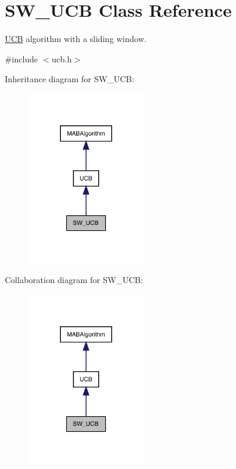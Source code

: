 \hypertarget{class_s_w___u_c_b}{}\section{S\+W\+\_\+\+U\+CB Class Reference}
\label{class_s_w___u_c_b}


\mbox{\hyperlink{class_u_c_b}{U\+CB}} algorithm with a sliding window.  




{\ttfamily \#include $<$ucb.\+h$>$}



Inheritance diagram for S\+W\+\_\+\+U\+CB\+:
\nopagebreak
\begin{figure}[H]
\begin{center}
\leavevmode
\includegraphics[width=144pt]{class_s_w___u_c_b__inherit__graph}
\end{center}
\end{figure}


Collaboration diagram for S\+W\+\_\+\+U\+CB\+:
\nopagebreak
\begin{figure}[H]
\begin{center}
\leavevmode
\includegraphics[width=144pt]{class_s_w___u_c_b__coll__graph}
\end{center}
\end{figure}
